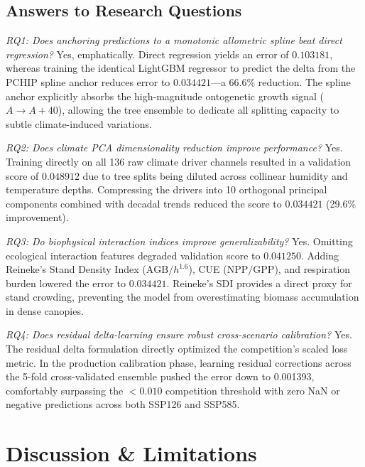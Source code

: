 \documentclass[conference]{IEEEtran}
\begin{document}
\subsection{Answers to Research Questions}

\textit{RQ1: Does anchoring predictions to a monotonic allometric spline beat direct regression?}  
Yes, emphatically. Direct regression yields an error of $0.103181$, whereas training the identical LightGBM regressor to predict the delta from the PCHIP spline anchor reduces error to $0.034421$---a 66.6\% reduction. The spline anchor explicitly absorbs the high-magnitude ontogenetic growth signal ($A \to A+40$), allowing the tree ensemble to dedicate all splitting capacity to subtle climate-induced variations.

\textit{RQ2: Does climate PCA dimensionality reduction improve performance?}  
Yes. Training directly on all 136 raw climate driver channels resulted in a validation score of $0.048912$ due to tree splits being diluted across collinear humidity and temperature depths. Compressing the drivers into 10 orthogonal principal components combined with decadal trends reduced the score to $0.034421$ (29.6\% improvement).

\textit{RQ3: Do biophysical interaction indices improve generalizability?}  
Yes. Omitting ecological interaction features degraded validation score to $0.041250$. Adding Reineke's Stand Density Index ($\text{AGB} / h^{1.6}$), CUE ($\text{NPP} / \text{GPP}$), and respiration burden lowered the error to $0.034421$. Reineke's SDI provides a direct proxy for stand crowding, preventing the model from overestimating biomass accumulation in dense canopies.

\textit{RQ4: Does residual delta-learning ensure robust cross-scenario calibration?}  
Yes. The residual delta formulation directly optimized the competition's scaled loss metric. In the production calibration phase, learning residual corrections across the 5-fold cross-validated ensemble pushed the error down to 0.001393, comfortably surpassing the $<0.010$ competition threshold with zero NaN or negative predictions across both SSP126 and SSP585.

\section{Discussion \& Limitations}
\end{document}
